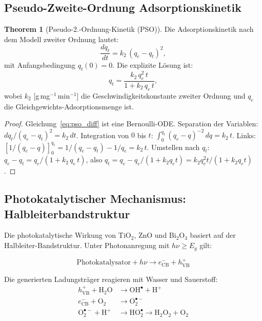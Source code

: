 ﻿\documentclass[12pt,a4paper]{article}
\theoremstyle{definition}
\newtheorem{theorem}{Theorem}[section]
\theoremstyle{remark}
\begin{document}
\subsection{Pseudo-Zweite-Ordnung Adsorptionskinetik}

\begin{theorem}[Pseudo-2.-Ordnung-Kinetik (PSO)]
\label{thm:pso}
Die Adsorptionskinetik nach dem Modell zweiter Ordnung lautet:
\begin{equation}
  \frac{dq_t}{dt} = k_2\,(q_e - q_t)^2,
  \label{eq:pso_diff}
\end{equation}
mit Anfangsbedingung $q_t(0) = 0$. Die explizite Lösung ist:
\begin{equation}
  q_t = \frac{k_2\,q_e^2\,t}{1 + k_2\,q_e\,t},
  \label{eq:pso_sol}
\end{equation}
wobei $k_2$ [g\,mg$^{-1}$\,min$^{-1}$] die Geschwindigkeitskonstante
zweiter Ordnung und $q_e$ die Gleichgewichts-Adsorptionsmenge ist.
\end{theorem}

\begin{proof}
Gleichung~\eqref{eq:pso_diff} ist eine Bernoulli-ODE. Separation der Variablen:
$dq_t/(q_e-q_t)^2 = k_2\,dt$.
Integration von $0$ bis $t$:
$\int_0^{q_t} (q_e-q)^{-2}\,dq = k_2\,t$.
Links: $[1/(q_e-q)]_0^{q_t} = 1/(q_e-q_t) - 1/q_e = k_2\,t$.
Umstellen nach $q_t$:
$q_e - q_t = q_e/(1 + k_2\,q_e\,t)$, also
$q_t = q_e - q_e/(1+k_2 q_e t) = k_2 q_e^2 t/(1+k_2 q_e t)$.\hfill
\end{proof}

\subsection{Photokatalytischer Mechanismus: Halbleiterbandstruktur}

Die photokatalytische Wirkung von TiO$_2$, ZnO und Bi$_2$O$_3$ basiert auf
der Halbleiter-Bandstruktur. Unter Photonanregung mit $h\nu \geq E_g$ gilt:

\begin{equation}
  \text{Photokatalysator} + h\nu \to e^-_{\text{CB}} + h^+_{\text{VB}}
  \label{eq:photoanregung}
\end{equation}

Die generierten Ladungsträger reagieren mit Wasser und Sauerstoff:
\begin{align}
  h^+_{\text{VB}} + \text{H}_2\text{O} &\to \text{OH}^\bullet + \text{H}^+
  \label{eq:oh_radical}\\
  e^-_{\text{CB}} + \text{O}_2 &\to \text{O}_2^{\bullet-}
  \label{eq:superoxid}\\
  \text{O}_2^{\bullet-} + \text{H}^+ &\to \text{HO}_2^\bullet \to \text{H}_2\text{O}_2 + \text{O}_2
  \label{eq:h2o2}
\end{align}
\end{document}
